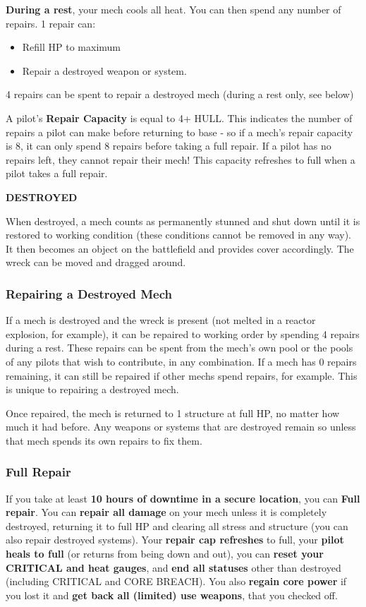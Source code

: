 \textbf{During a rest}, your mech cools all heat. You can then spend any number of repairs. 1 repair can:
\begin{itemize}
\item Refill HP to maximum 
\item Repair a destroyed weapon or system. 
\end{itemize}  
4 repairs can be spent to repair a destroyed mech (during a rest only, see below) 

A pilot’s \textbf{Repair Capacity} is equal to 4+ HULL. This indicates the number of repairs a pilot can make before returning to base - so if a mech’s repair capacity is 8, it can only spend 8 repairs before taking a full repair. If a pilot has no repairs left, they cannot repair their mech! This capacity refreshes to full when a pilot takes a full repair. 

\begin{center}
  \textbf{DESTROYED}
\end{center}

When destroyed, a mech counts as permanently stunned and shut down until it is restored to working condition (these conditions cannot be removed in any way). It then becomes an object on the battlefield and provides cover accordingly. The wreck can be moved and dragged around.

\subsubsection{Repairing a Destroyed Mech}

If a mech is destroyed and the wreck is present (not melted in a reactor explosion, for example), it can be repaired to working order by spending 4 repairs during a rest. These repairs can be spent from the mech’s own pool or the pools of any pilots that wish to contribute, in any combination. If a mech has 0 repairs remaining, it can still be repaired if other mechs spend repairs, for example. This is unique to repairing a destroyed mech.

Once repaired, the mech is returned to 1 structure at full HP, no matter how much it had before. Any weapons or systems that are destroyed remain so unless that mech spends its own repairs to fix them.

\subsubsection{Full Repair}

If you take at least \textbf{10 hours of downtime in a secure location}, you can \textbf{Full repair}. You can \textbf{repair all damage} on your mech unless it is completely destroyed, returning it to full HP and clearing all stress and structure (you can also repair destroyed systems). Your \textbf{repair cap refreshes} to full, your \textbf{pilot heals to full} (or returns from being down and out), you can \textbf{reset your CRITICAL and heat gauges}, and \textbf{end all statuses} other than destroyed (including CRITICAL and CORE BREACH). You also \textbf{regain core power} if you lost it and \textbf{get back all (limited) use weapons}, that you checked off.


